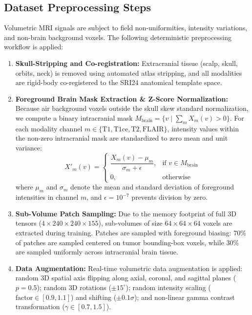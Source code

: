 \documentclass[conference]{IEEEtran}
\begin{document}
\subsection{Dataset Preprocessing Steps}
Volumetric MRI signals are subject to field non-uniformities, intensity variations, and non-brain background voxels. The following deterministic preprocessing workflow is applied:
\begin{enumerate}
    \item \textbf{Skull-Stripping and Co-registration:} Extracranial tissue (scalp, skull, orbits, neck) is removed using automated atlas stripping, and all modalities are rigid-body co-registered to the SRI24 anatomical template space.
    \item \textbf{Foreground Brain Mask Extraction \& Z-Score Normalization:} Because air background voxels outside the skull skew standard normalization, we compute a binary intracranial mask $M_{\text{brain}} = \{v \mid \sum_{m} X_m(v) > 0\}$. For each modality channel $m \in \{\text{T1}, \text{T1ce}, \text{T2}, \text{FLAIR}\}$, intensity values within the non-zero intracranial mask are standardized to zero mean and unit variance:
    \begin{equation}
    X'_m(v) = \begin{cases} \dfrac{X_m(v) - \mu_m}{\sigma_m + \epsilon}, & \text{if } v \in M_{\text{brain}} \\ 0, & \text{otherwise} \end{cases}
    \end{equation}
    where $\mu_m$ and $\sigma_m$ denote the mean and standard deviation of foreground intensities in channel $m$, and $\epsilon = 10^{-7}$ prevents division by zero.
    \item \textbf{Sub-Volume Patch Sampling:} Due to the memory footprint of full 3D tensors ($4 \times 240 \times 240 \times 155$), sub-volumes of size $64 \times 64 \times 64$ voxels are extracted during training. Patches are sampled with foreground biasing: 70\% of patches are sampled centered on tumor bounding-box voxels, while 30\% are sampled uniformly across intracranial brain tissue.
    \item \textbf{Data Augmentation:} Real-time volumetric data augmentation is applied: random 3D spatial axis flipping along axial, coronal, and sagittal planes ($p = 0.5$); random 3D rotations ($\pm 15^\circ$); random intensity scaling ($\text{factor} \in [0.9, 1.1]$) and shifting ($\pm 0.1\sigma$); and non-linear gamma contrast transformation ($\gamma \in [0.7, 1.5]$).
\end{enumerate}
\end{document}
